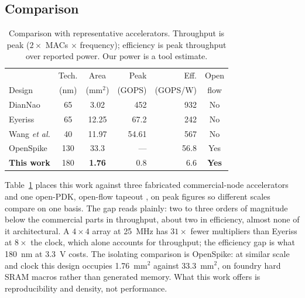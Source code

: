 \documentclass[conference,a4paper]{APSIPA2026}
\begin{document}
\subsection{Comparison}

\begin{table}[!ht]
\caption{Comparison with representative accelerators. Throughput is peak ($2\times$ MACs $\times$ frequency); efficiency is peak throughput over reported power. Our power is a tool estimate.}
\label{tab:compare}
\centering
\small
\renewcommand{\arraystretch}{1.12}
\begin{tabular}{@{}lccrrc@{}}
\toprule
 & Tech. & Area & Peak & Eff. & Open \\
Design & (nm) & (mm$^2$) & (GOPS) & (GOPS/W) & flow \\
\midrule
DianNao \cite{diannao}   & 65  & 3.02  & 452   & 932 & No \\
Eyeriss \cite{eyeriss}   & 65  & 12.25 & 67.2  & 242 & No \\
Wang \emph{et al.} \cite{wang} & 40 & 11.97 & 54.61 & 567 & No \\
OpenSpike \cite{openspike} & 130 & 33.3 & ---   & 56.8 & Yes \\
\textbf{This work}       & 180 & \textbf{1.76} & 0.8 & 6.6 & \textbf{Yes} \\
\bottomrule
\end{tabular}
\end{table}
Table~\ref{tab:compare} places this work against three fabricated commercial-node accelerators \cite{diannao, eyeriss, wang} and one open-PDK, open-flow tapeout \cite{openspike}, on peak figures so different scales compare on one basis. The gap reads plainly: two to three orders of magnitude below the commercial parts in throughput, about two in efficiency, almost none of it architectural. A $4\times4$ array at 25~MHz has $31\times$ fewer multipliers than Eyeriss at $8\times$ the clock, which alone accounts for throughput; the efficiency gap is what 180~nm at 3.3~V costs. The isolating comparison is OpenSpike: at similar scale and clock this design occupies 1.76~mm$^2$ against 33.3~mm$^2$, on foundry hard SRAM macros rather than generated memory. What this work offers is reproducibility and density, not performance.
\end{document}
